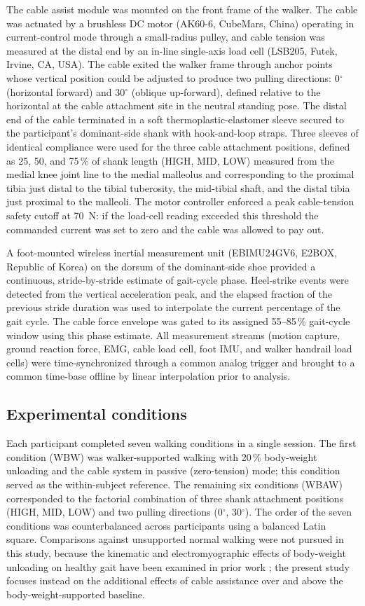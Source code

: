 \documentclass[11pt,a4paper]{article}
\begin{document}
The cable assist module was mounted on the front frame of the walker. The cable was actuated by a brushless DC motor (AK60-6, CubeMars, China) operating in current-control mode through a small-radius pulley, and cable tension was measured at the distal end by an in-line single-axis load cell (LSB205, Futek, Irvine, CA, USA). The cable exited the walker frame through anchor points whose vertical position could be adjusted to produce two pulling directions: 0$^\circ$ (horizontal forward) and 30$^\circ$ (oblique up-forward), defined relative to the horizontal at the cable attachment site in the neutral standing pose. The distal end of the cable terminated in a soft thermoplastic-elastomer sleeve secured to the participant's dominant-side shank with hook-and-loop straps. Three sleeves of identical compliance were used for the three cable attachment positions, defined as 25, 50, and 75\,\% of shank length (HIGH, MID, LOW) measured from the medial knee joint line to the medial malleolus and corresponding to the proximal tibia just distal to the tibial tuberosity, the mid-tibial shaft, and the distal tibia just proximal to the malleoli. The motor controller enforced a peak cable-tension safety cutoff at 70~N: if the load-cell reading exceeded this threshold the commanded current was set to zero and the cable was allowed to pay out.

A foot-mounted wireless inertial measurement unit (EBIMU24GV6, E2BOX, Republic of Korea) on the dorsum of the dominant-side shoe provided a continuous, stride-by-stride estimate of gait-cycle phase. Heel-strike events were detected from the vertical acceleration peak, and the elapsed fraction of the previous stride duration was used to interpolate the current percentage of the gait cycle. The cable force envelope was gated to its assigned 55--85\,\% gait-cycle window using this phase estimate. All measurement streams (motion capture, ground reaction force, EMG, cable load cell, foot IMU, and walker handrail load cells) were time-synchronized through a common analog trigger and brought to a common time-base offline by linear interpolation prior to analysis.

\subsection{Experimental conditions}
Each participant completed seven walking conditions in a single session. The first condition (WBW) was walker-supported walking with 20\,\% body-weight unloading and the cable system in passive (zero-tension) mode; this condition served as the within-subject reference. The remaining six conditions (WBAW) corresponded to the factorial combination of three shank attachment positions (HIGH, MID, LOW) and two pulling directions (0$^\circ$, 30$^\circ$). The order of the seven conditions was counterbalanced across participants using a balanced Latin square. Comparisons against unsupported normal walking were not pursued in this study, because the kinematic and electromyographic effects of body-weight unloading on healthy gait have been examined in prior work \citep{apte2018,goldberg2013}; the present study focuses instead on the additional effects of cable assistance over and above the body-weight-supported baseline.
\end{document}
